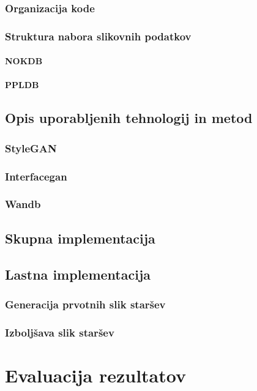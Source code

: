 \documentclass[a4paper,12pt,openright]{book}
\begin{document}
\subsection{Organizacija kode}
\subsection{Struktura nabora slikovnih podatkov}
\subsubsection{NOKDB}
\subsubsection{PPLDB}

\section{Opis uporabljenih tehnologij in metod}
\subsection{StyleGAN}
\subsection{Interfacegan}
\subsection{Wandb}

\section{Skupna implementacija}

\section{Lastna implementacija}
\subsection{Generacija prvotnih slik staršev}
\subsection{Izboljšava slik staršev}



\chapter{Evaluacija rezultatov}
\end{document}
